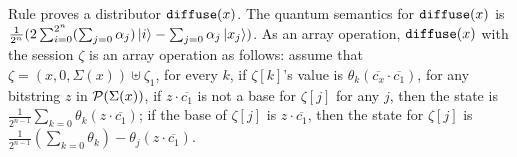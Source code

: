 Rule  proves a distributor $\texttt{diffuse}(x)$.
The quantum semantics for $\texttt{diffuse}(x)$ is $\frac{1}{2^{n}}(2\sum_{i=0}^{2^n}(\sum_{j=0}\alpha_j)\left\vert{i}\right\rangle - \sum_{j=0}\alpha_j\left\vert{x_j}\right\rangle)$.
As an array operation, $\texttt{diffuse}(x)$ with the session $\zeta$ is an array operation as follows:
assume that $\zeta=(x,0,\Sigma(x))\uplus\zeta_1$, for every $k$,
if $\zeta[k]$'s value is $\theta_k(\overline{c_x}\cdot \overline{c_1})$,
for any bitstring $z$ in $\mathcal{P}(\Sigma(x))$, if $z\cdot \overline{c_1}$
is not a base for $\zeta[j]$ for any $j$, then the state is
$\frac{1}{2^{n-1}}\sum_{k=0}\theta_k(z\cdot \overline{c_1})$;
if the base of $\zeta[j]$ is $z\cdot \overline{c_1}$,
then the state for $\zeta[j]$ is $\frac{1}{2^{n-1}}(\sum_{k=0}\theta_k)-\theta_j(z\cdot \overline{c_1})$.







